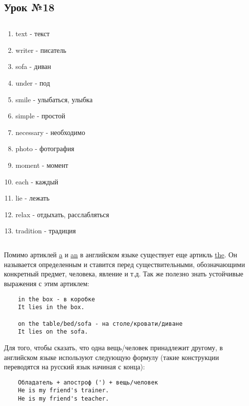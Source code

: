 \subsection{Урок №18}

\subsection*{}
\begin{multicols}{2}
    \begin{enumerate}\setlength{\itemsep}{0pt}
        \item text - текст
        \item writer - писатель
        \item sofa - диван
        \item under - под
        \item smile - улыбаться, улыбка
        \item simple - простой
        \item necessary - необходимо
        \item photo - фотография
        \item moment - момент
        \item each - каждый
        \item lie - лежать
        \item relax - отдыхать, расслабляться
        \item tradition - традиция
    \end{enumerate}
\end{multicols}

\subsection*{}
Помимо артиклей \underline{a} и \underline{an} в английском языке существует еще артикль \underline{the}.
Он называется определенным и ставится перед существительными, обозначающими конкретный предмет, человека,
явление и т.д. Так же полезно знать устойчивые выражения с этим артиклем:
\begin{verbatim}
    in the box - в коробке
    It lies in the box.

    on the table/bed/sofa - на столе/кровати/диване
    It lies on the sofa.
\end{verbatim}

Для того, чтобы сказать, что одна вещь/человек принадлежит другому, в английском языке используют следующую
формулу (такие конструкции переводятся на русский язык начиная с конца):
\begin{verbatim}
    Обладатель + апостроф (') + вещь/человек
    He is my friend's trainer.
    He is my friend's teacher.
\end{verbatim}